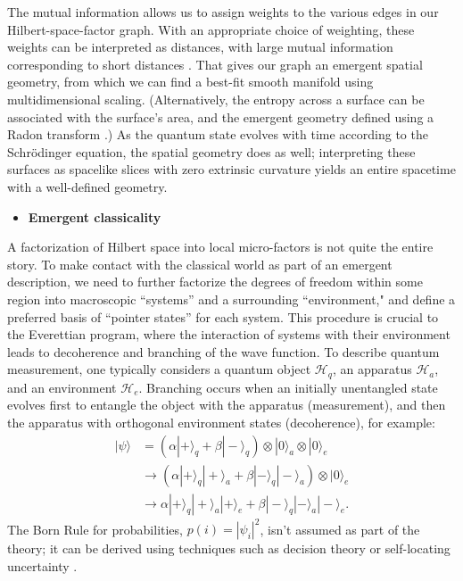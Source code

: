 \documentclass[12pt,english]{article}
\newcommand{\HH}{\mathcal{H}}
\begin{document}
The mutual information allows us to assign weights to the various edges in our Hilbert-space-factor graph.
With an appropriate choice of weighting, these weights can be interpreted as distances, with large mutual information corresponding to short distances \cite{Cao:2016mst}.
That gives our graph an emergent spatial geometry, from which we can find a best-fit smooth manifold using multidimensional scaling.
(Alternatively, the entropy across a surface can be associated with the surface's area, and the emergent geometry defined using a Radon transform \cite{Cao:2017hrv}.)
As the quantum state evolves with time according to the Schr\"odinger equation, the spatial geometry does as well; interpreting these surfaces as spacelike slices with zero extrinsic curvature yields an entire spacetime with a well-defined geometry.

\begin{itemize}
\item \textbf{Emergent classicality}
\end{itemize}

A factorization of Hilbert space into local micro-factors is not quite the entire story.
To make contact with the classical world as part of an emergent description, we need to further factorize the degrees of freedom within some region into macroscopic ``systems'' and a surrounding ``environment," and define a preferred basis of ``pointer states'' for each system. 
This procedure is crucial to the Everettian program, where the interaction of systems with their environment leads to decoherence and branching of the wave function.
To describe quantum measurement, one typically considers a quantum object $\HH_q$, an apparatus $\HH_a$, and an environment $\HH_e$.
Branching occurs when an initially unentangled state evolves first to entangle the object with the apparatus (measurement), and then the apparatus with orthogonal environment states (decoherence), for example:
\begin{align}
  |\psi\rangle &= (\alpha|+\rangle_q + \beta|-\rangle_q)\otimes |0\rangle_a \otimes |0\rangle_e \\
  & \rightarrow (\alpha|+\rangle_q|+\rangle_a + \beta|-\rangle_q|-\rangle_a) \otimes |0\rangle_e \\
  & \rightarrow \alpha|+\rangle_q|+\rangle_a|+\rangle_e + \beta|-\rangle_q|-\rangle_a|-\rangle_e .
\end{align}
The Born Rule for probabilities, $p(i) = |\psi_i|^2$, isn't assumed as part of the theory; it can be derived using techniques such as decision theory\cite{2009arXiv0906.2718W} or self-locating uncertainty \cite{Sebens:2014iwa}.
\end{document}
